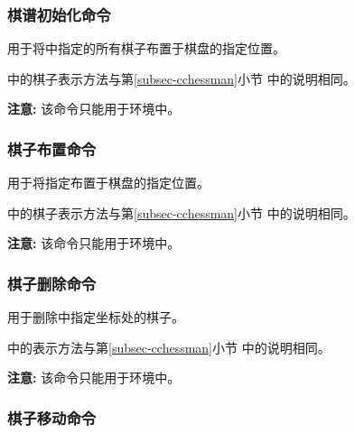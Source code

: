 \documentclass[full]{l3doc}
\begin{document}
\begin{documentation}
\subsubsection{棋谱初始化命令}

\begin{function}{\init}
  \begin{syntax}
     
  \end{syntax}
\end{function}

  用于将中指定的所有棋子布置于棋盘的指定位置。

  中的棋子表示方法与第\ref{subsec-cchessman}小节
  中的说明相同。

  \textbf{\textsf{注意: }}该命令只能用于环境中。

\subsubsection{棋子布置命令}

\begin{function}{\set}
  \begin{syntax}
     
  \end{syntax}
\end{function}

  用于将指定布置于棋盘的指定位置。

  中的棋子表示方法与第\ref{subsec-cchessman}小节
  中的说明相同。

  \textbf{\textsf{注意: }}该命令只能用于环境中。

\subsubsection{棋子删除命令}

\begin{function}{\del}
  \begin{syntax}
     
  \end{syntax}
\end{function}

  用于删除中指定坐标处的棋子。

  中的表示方法与第\ref{subsec-cchessman}小节
  中的说明相同。

  \textbf{\textsf{注意: }}该命令只能用于环境中。

\subsubsection{棋子移动命令}


\end{documentation}
\end{document}
